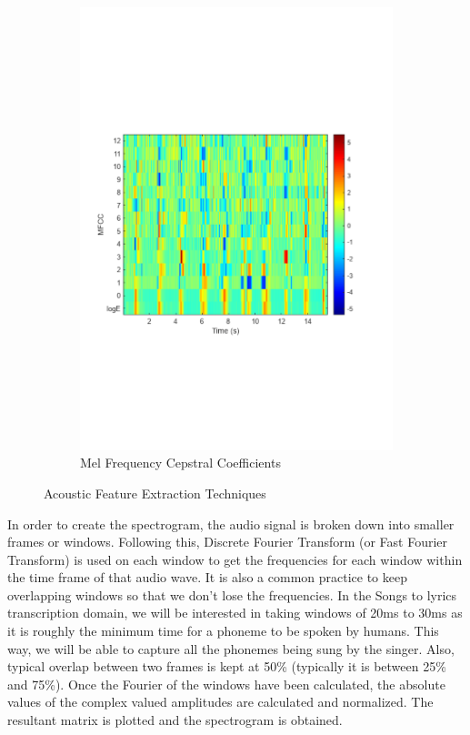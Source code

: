 \begin{figure}
\begin{subfigure}[b]{0.48\textwidth}
         \includegraphics[width=\textwidth]{03-Theoretical Foundations/figures/mfcc_matlab.pdf}
         \caption{Mel Frequency Cepstral Coefficients}
         \label{fig:mfcc}
     \end{subfigure}
     \hfill
        \caption{Acoustic Feature Extraction Techniques}
        \label{fig:acoustic_feature_extract}
\end{figure}

In order to create the spectrogram, the audio signal is broken down into smaller frames or windows. Following this, Discrete Fourier Transform (or Fast Fourier Transform) is used on each window to get the frequencies for each window within the time frame of that audio wave. It is also a common practice to keep overlapping windows so that we don't lose the frequencies. In the Songs to lyrics transcription domain, we will be interested in taking windows of 20ms to 30ms as it is roughly the minimum time for a phoneme to be spoken by humans. This way, we will be able to capture all the phonemes being sung by the singer. Also, typical overlap between two frames is kept at 50\% (typically it is between 25\% and 75\%). Once the Fourier of the windows have been calculated, the absolute values of the complex valued amplitudes are calculated and normalized. The resultant matrix is plotted and the spectrogram is obtained. 

